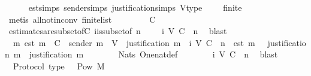 \begin{isabellebody}
\ \ \ \ \isamarkupfalse%
\ est{\isachardot}simps\ sender{\isachardot}simps\ justification{\isachardot}simps\ V{\isacharunderscore}type\ {\isacartoucheopen}{\isasymepsilon}\ {\isasymsigma}\ {\isasymnoteq}\ {\isasymemptyset}{\isacartoucheclose}\ {\isacartoucheopen}finite\ {\isasymsigma}{\isacartoucheclose}\isanewline
\ \ \ \ \isamarkupfalse%
\ {\isacharparenleft}metis\ all{\isacharunderscore}not{\isacharunderscore}in{\isacharunderscore}conv\ finite{\isacharunderscore}list{\isacharparenright}\isanewline
\ \ \isamarkupfalse%
\ \isamarkupfalse%
\ {\isachardoublequoteopen}{\isasymepsilon}\ {\isasymsigma}\ {\isasymsubseteq}\ C{\isachardoublequoteclose}\isanewline
\ \ \ \ \isamarkupfalse%
\ estimates{\isacharunderscore}are{\isacharunderscore}subset{\isacharunderscore}of{\isacharunderscore}C\ {\isasymSigma}i{\isacharunderscore}is{\isacharunderscore}subset{\isacharunderscore}of{\isacharunderscore}{\isasymSigma}\ {\isacartoucheopen}n\ {\isasymin}\ {\isasymnat}{\isacartoucheclose}\ {\isacartoucheopen}{\isasymsigma}\ {\isasymin}\ {\isasymSigma}{\isacharunderscore}i\ {\isacharparenleft}V{\isacharcomma}\ C{\isacharcomma}\ {\isasymepsilon}{\isacharparenright}\ n{\isacartoucheclose}\ \isamarkupfalse%
\ blast\isanewline
\ \ \isamarkupfalse%
\ \isamarkupfalse%
\ {\isachardoublequoteopen}{\isasymexists}\ m{\isachardot}\ est\ m\ {\isasymin}\ C\ {\isasymand}\ sender\ m\ {\isasymin}\ V\ {\isasymand}\ justification\ m\ {\isasymin}\ {\isasymSigma}{\isacharunderscore}i\ {\isacharparenleft}V{\isacharcomma}\ C{\isacharcomma}\ {\isasymepsilon}{\isacharparenright}\ n\ {\isasymand}\ est\ m\ {\isasymin}\ {\isasymepsilon}\ {\isacharparenleft}justification\ m{\isacharparenright}\ {\isasymand}\ justification\ m\ {\isacharequal}\ {\isasymsigma}{\isachardoublequoteclose}\isanewline
\ \ \ \ \isamarkupfalse%
\ Nats{\isacharunderscore}{}\ One{\isacharunderscore}nat{\isacharunderscore}def\isanewline
\ \ \ \ \isamarkupfalse%
\ {\isacartoucheopen}{\isasymsigma}\ {\isasymin}\ {\isasymSigma}{\isacharunderscore}i\ {\isacharparenleft}V{\isacharcomma}\ C{\isacharcomma}\ {\isasymepsilon}{\isacharparenright}\ n{\isacartoucheclose}\ \isamarkupfalse%
\ blast\isanewline
{}\isamarkupfalse%
%
\endisatagproof
{\isafoldproof}%
%
\isadelimproof
\isanewline
%
\endisadelimproof
\isanewline
{}\isamarkupfalse%
\ {\isacharparenleft}\ Protocol{\isacharparenright}\ {\isasymSigma}{\isacharunderscore}type{\isacharcolon}\ {\isachardoublequoteopen}{\isasymSigma}\ {\isasymsubset}\ Pow\ M{\isachardoublequoteclose}\isanewline

\end{isabellebody}
